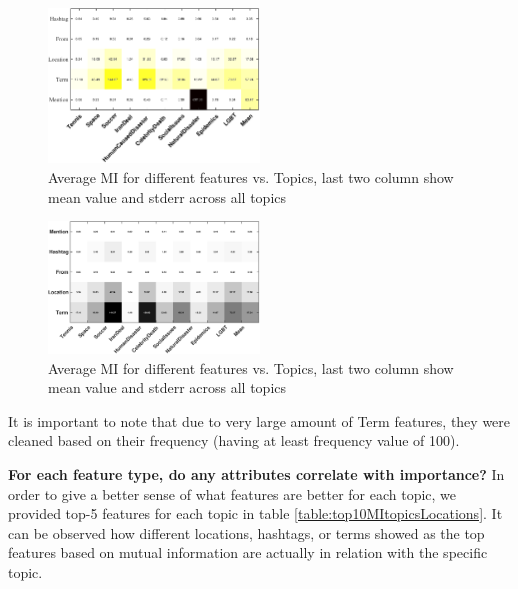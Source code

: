 \begin{figure}[h!]
\centering
\includegraphics[width=0.5\textwidth]{images/avgMI2.pdf}
\vspace{-3mm}
\caption{Average MI for different features vs. Topics, last two column show mean value and stderr across all topics}
\label{fig:table1}
\end{figure}
\fi
\begin{figure}[h!]
\centering
\includegraphics[width=0.5\textwidth]{images/avgMI_gray.pdf}
\vspace{-3mm}
\caption{Average MI for different features vs. Topics, last two column show mean value and stderr across all topics}
\label{fig:table1}
\end{figure}

It is important to note that due to very large amount of Term features, they were cleaned based on their frequency (having at least frequency value of 100).

\textbf{For each feature type, do any attributes correlate with importance?} In order to give a better sense of what features are better for each topic, we provided top-5 features for each topic in table \ref{table:top10MItopicsLocations}. It can be observed how different locations, hashtags, or terms showed as the top features based on mutual information are actually in relation with the specific topic.%

